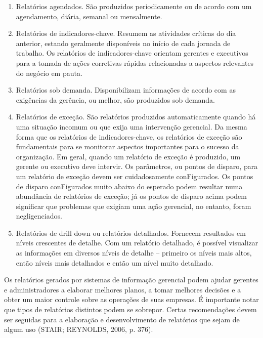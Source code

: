 \documentclass[a4paper]{article}
\newcommand\liststyleWWviiiNumiii{%
\renewcommand\theenumi{\alph{enumi}}
\renewcommand\theenumii{\arabic{enumii}}
\renewcommand\theenumiii{\arabic{enumiii}}
\renewcommand\theenumiv{\arabic{enumiv}}
\renewcommand\labelenumi{\theenumi)}
\renewcommand\labelenumii{\theenumii.}
\renewcommand\labelenumiii{\theenumiii.}
\renewcommand\labelenumiv{\theenumiv.}
}
\begin{document}
\liststyleWWviiiNumiii
\begin{enumerate}
\item {
\textsf{Relat\'orios agendados. S\~ao produzidos periodicamente ou de acordo com um agendamento, di\'aria, semanal ou
mensalmente. }}
\item {
\textsf{Relat\'orios de indicadores-chave. Resumem as atividades cr\'iticas do dia anterior, estando geralmente
dispon\'iveis no in\'icio de cada jornada de trabalho. Os relat\'orios de indicadores-chave orientam gerentes e
executivos para a tomada de a\c{c}\~oes corretivas r\'apidas relacionadas a aspectos relevantes do neg\'ocio em pauta.
}}
\item {
\textsf{Relat\'orios sob demanda. Disponibilizam informa\c{c}\~oes de acordo com as exig\^encias da ger\^encia, ou
melhor, s\~ao produzidos sob demanda. }}
\item {
\textsf{Relat\'orios de exce\c{c}\~ao. S\~ao relat\'orios produzidos automaticamente quando h\'a uma situa\c{c}\~ao
incomum ou que exija uma interven\c{c}\~ao gerencial. Da mesma forma que os relat\'orios de indicadores-chave, os
relat\'orios de exce\c{c}\~ao s\~ao fundamentais para se monitorar aspectos importantes para o sucesso da
organiza\c{c}\~ao. Em geral, quando um relat\'orio de exce\c{c}\~ao \'e produzido, um gerente ou executivo deve
intervir. Os par\^ametros, ou pontos de disparo, para um relat\'orio }\textsf{de exce\c{c}\~ao devem ser cuidadosamente
conFigurados. Os pontos de disparo conFigurados muito abaixo do esperado podem resultar numa abund\^ancia de
relat\'orios de exce\c{c}\~ao; j\'a os pontos de disparo acima podem significar que problemas que exigiam uma
a\c{c}\~ao gerencial, no entanto, foram negligenciados. }}
\item {
\textsf{Relat\'orios de drill down ou relat\'orios detalhados. Fornecem resultados em n\'iveis crescentes de detalhe.
Com um relat\'orio detalhado, \'e poss\'ivel visualizar as informa\c{c}\~oes em diversos n\'iveis de detalhe --
primeiro os n\'iveis mais altos, ent\~ao n\'iveis mais detalhados e ent\~ao um n\'ivel muito detalhado. }}
\end{enumerate}
{
\textsf{Os relat\'orios gerados por sistemas de informa\c{c}\~ao gerencial podem ajudar gerentes e administradores a
elaborar melhores planos, a tomar melhores decis\~oes e a obter um maior controle sobre as opera\c{c}\~oes de suas
empresas. \'E importante notar que tipos de relat\'orios distintos podem se sobrepor. Certas recomenda\c{c}\~oes devem
ser seguidas para a elabora\c{c}\~ao e desenvolvimento de relat\'orios que sejam de algum uso (STAIR; REYNOLDS, 2006,
p. 376).}}
\end{document}
